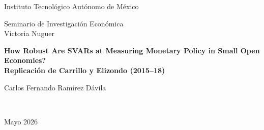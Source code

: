 \documentclass[12pt,a4paper]{article}
\newcommand{\blower}{\beta_{\text{lower}}}
\begin{document}


\begin{titlepage}
\centering
\vspace*{2cm}

{\large Instituto Tecnológico Autónomo de México \par}
\vspace{0.5cm}
{\large Seminario de Investigación Económica \\ Victoria Nuguer \par}
\vspace{3cm}

{\LARGE\bfseries How Robust Are SVARs at Measuring Monetary Policy in Small Open Economies?\\[6pt]
Replicación de Carrillo y Elizondo (2015--18) \par}
\vspace{2cm}

{\large Carlos Fernando Ramírez Dávila \par}
\vspace{0.5cm}
{\normalsize \texttt{ } \par}
\vspace{2cm}

{\normalsize Mayo 2026 \par}
\vspace{3cm}

\begin{abstract}
\noindent Este trabajo replica el ejercicio empírico de \citet{carrilloelizondo2018} para México,
comparando tres estrategias de identificación en modelos de vectores autorregresivos
estructurales (SVAR): restricciones de exclusión mediante la descomposición de Cholesky, restricciones de signo simples y restricciones de signo aumentadas.
Se utilizan datos mensuales del período enero 2001–marzo 2014 y un VAR(3) con seis variables endógenas y un bloque de tres variables exógenas.Se muestra que las tres estrategias convergen cualitativamente en horizontes de seis a doce meses: un choque monetario contractivo reduce el producto y la inflación,
aprecia el tipo de cambio real y contrae los agregados monetarios.
La principal diferencia entre esquemas se concentra en la respuesta contemporánea de la inflación, donde además las restricciones de signo simples producen efectos implausibles de gran impacto, que las restricciones aumentadas corrigen mediante una cota
inferior de elasticidad inflación\-tasa estimada con datos históricos
Los resultados sugieren que las conclusiones cualitativas sobre transmisión
monetaria en México son robustas a la estrategia de identificación, aunque
la elección del esquema sí tiene consecuencias cuantitativas notorias en el corto plazo.

\medskip

\end{abstract}

\end{titlepage}
\end{document}
